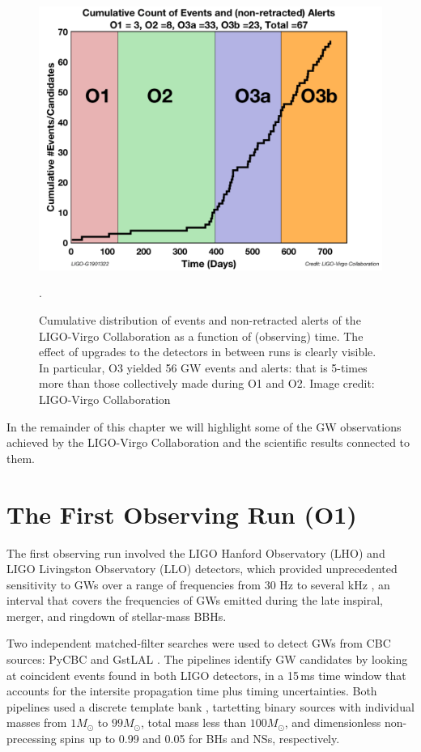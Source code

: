 \documentclass[binding=0.6cm, LaM]{sapthesis}
\begin{document}
        \begin{figure}[!t]
          \label{o3detection}
          \includegraphics[scale=0.22]{o3detection}
          \centering
          \caption{Cumulative distribution of events and non-retracted alerts of the LIGO-Virgo Collaboration as a function of (observing) time.  The effect of upgrades to the detectors in between runs is clearly visible.  In particular, O3 yielded 56 GW events and alerts: that is 5-times more than those collectively made during O1 and O2. Image credit: LIGO-Virgo Collaboration}. 
          \label{fig:o3detection}
        \end{figure}

        In the remainder of this chapter we will highlight some of the GW observations achieved 
	by the LIGO-Virgo Collaboration and the scientific results connected to them.

\section{The First Observing Run (O1)}

	The first observing run involved the LIGO Hanford Observatory (LHO) and LIGO Livingston Observatory (LLO) detectors, 
	which provided unprecedented sensitivity to GWs
	over a range of frequencies from 30 Hz to several kHz \cite{14}, an interval that  
	covers the frequencies of GWs emitted during 
	the late inspiral, merger, and ringdown of stellar-mass BBHs.

	Two independent matched-filter searches were used to detect GWs from CBC sources: 
	{\ttfamily PyCBC} \cite{109-112} and {\ttfamily GstLAL} \cite{112-114}.
	The pipelines identify GW candidates by looking at coincident events 
	found in both LIGO detectors, in a 15\,ms time window 
	that accounts for the intersite propagation time plus timing uncertainties. 
	Both pipelines used a discrete template bank \cite{42, 114, 115, 117-120}, 
	tartetting binary sources with individual masses from $1{M_\odot}$ to $99{M_\odot}$,
	total mass less than $100{M_\odot}$, and dimensionless non-precessing spins up to 0.99 and 0.05 for BHs and NSs, respectively.
\end{document}
